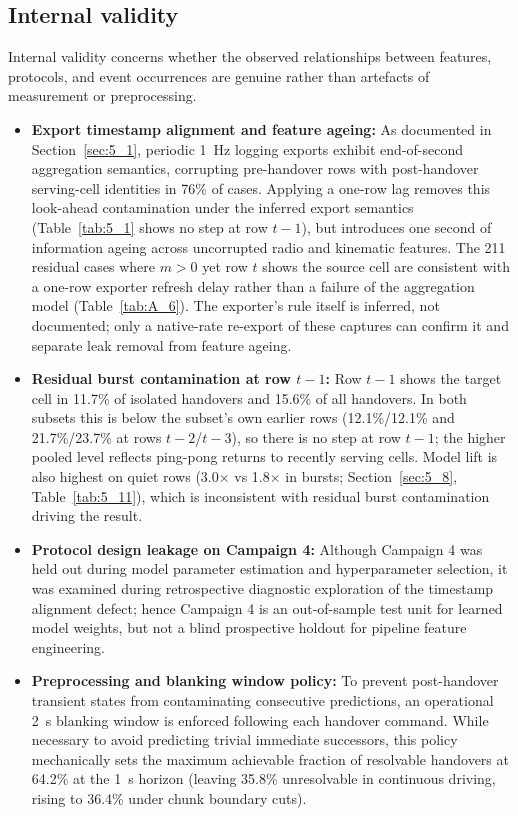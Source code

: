 \subsection{Internal validity}
Internal validity concerns whether the observed relationships between features, protocols, and event occurrences are genuine rather than artefacts of measurement or preprocessing.
\begin{itemize}
    \item \textbf{Export timestamp alignment and feature ageing:} As documented in Section~\ref{sec:5_1}, periodic 1~Hz logging exports exhibit end-of-second aggregation semantics, corrupting pre-handover rows with post-handover serving-cell identities in 76\% of cases. Applying a one-row lag removes this look-ahead contamination under the inferred export semantics (Table~\ref{tab:5_1} shows no step at row $t-1$), but introduces one second of information ageing across uncorrupted radio and kinematic features. The 211 residual cases where $m > 0$ yet row $t$ shows the source cell are consistent with a one-row exporter refresh delay rather than a failure of the aggregation model (Table~\ref{tab:A_6}). The exporter's rule itself is inferred, not documented; only a native-rate re-export of these captures can confirm it and separate leak removal from feature ageing.
    \item \textbf{Residual burst contamination at row $t-1$:} Row $t-1$ shows the target cell in 11.7\% of isolated handovers and 15.6\% of all handovers. In both subsets this is below the subset's own earlier rows (12.1\%/12.1\% and 21.7\%/23.7\% at rows $t-2$/$t-3$), so there is no step at row $t-1$; the higher pooled level reflects ping-pong returns to recently serving cells. Model lift is also highest on quiet rows (3.0$\times$ vs 1.8$\times$ in bursts; Section~\ref{sec:5_8}, Table~\ref{tab:5_11}), which is inconsistent with residual burst contamination driving the result.
    \item \textbf{Protocol design leakage on Campaign 4:} Although Campaign 4 was held out during model parameter estimation and hyperparameter selection, it was examined during retrospective diagnostic exploration of the timestamp alignment defect; hence Campaign 4 is an out-of-sample test unit for learned model weights, but not a blind prospective holdout for pipeline feature engineering.
    \item \textbf{Preprocessing and blanking window policy:} To prevent post-handover transient states from contaminating consecutive predictions, an operational 2~s blanking window is enforced following each handover command. While necessary to avoid predicting trivial immediate successors, this policy mechanically sets the maximum achievable fraction of resolvable handovers at 64.2\% at the 1~s horizon (leaving 35.8\% unresolvable in continuous driving, rising to 36.4\% under chunk boundary cuts).

\end{itemize}
